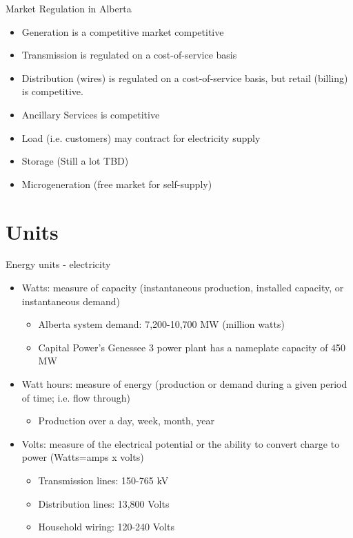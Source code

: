 \documentclass{beamer}
\renewcommand{\(}{\begin{columns}}
\renewcommand{\)}{\end{columns}}
\newcommand{\<}[1]{\begin{column}{#1}}
\renewcommand{\>}{\end{column}}
\begin{document}
\begin{frame}{Market Regulation in Alberta}
\begin{itemize}
\setlength\itemsep{1.7em}
\item Generation is a competitive market competitive

\item Transmission is regulated on a cost-of-service basis

\item Distribution (wires) is regulated on a cost-of-service basis, but retail (billing) is competitive.

\item Ancillary Services is competitive

\item Load (i.e. customers) may contract for electricity supply
 
\item Storage (Still a lot TBD)

\item Microgeneration (free market for self-supply)
\end{itemize}

\vfill \end{frame}





\section{Units}

\begin{frame}{Energy units - electricity}
\begin{itemize}
\setlength\itemsep{.75em}
\item Watts: measure of capacity (instantaneous production, installed capacity, or instantaneous demand)
\begin{itemize}
\setlength\itemsep{.5em}
\item Alberta system demand: 7,200-10,700 MW (million watts)
\item Capital Power's Genessee 3 power plant has a nameplate capacity of 450 MW
\end{itemize}
\item Watt hours: measure of energy (production or demand during a given period of time; i.e. flow through)
\begin{itemize}
\setlength\itemsep{.5em}
\item Production over a day, week, month, year
\end{itemize}
\item Volts: measure of the electrical potential or the ability to convert charge to power (Watts=amps x volts)
\begin{itemize}
\setlength\itemsep{.5em}
\item Transmission lines: 150-765 kV
\item Distribution lines: 13,800 Volts
\item Household wiring: 120-240 Volts
\end{itemize}
\end{itemize}
\vfill \end{frame}
\end{document}
